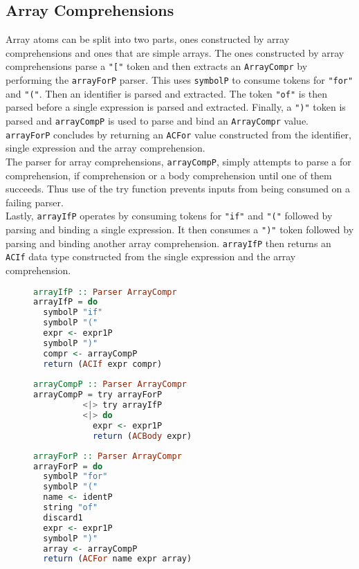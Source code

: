 \documentclass{article}
\begin{document}
\subsection{Array Comprehensions}
Array atoms can be split into two parts, ones constructed by array comprehensions and ones that are simple arrays. The ones constructed by array comprehensions parse a \texttt{"["} token and then extracts an \texttt{ArrayCompr} by performing the \texttt{arrayForP} parser. This uses \texttt{symbolP} to consume tokens for \texttt{"for"} and \texttt{"("}. Then an identifier is parsed and extracted. The token \texttt{"of"} is then parsed before a single expression is parsed and extracted. Finally, a \texttt{")"} token is parsed and \texttt{arrayCompP} is used to parse and bind an \texttt{ArrayCompr} value. \texttt{arrayForP} concludes by returning an \texttt{ACFor} value constructed from the identifier, single expression and the array comprehension.
\bigskip
\\
The parser for array comprehensions, \texttt{arrayCompP}, simply attempts to parse a for comprehension, if comprehension or a body comprehension until one of them succeeds. Thus use of the try function prevents inputs from being consumed on a failing parser.
\bigskip
\\
Lastly, \texttt{arrayIfP} operates by consuming tokens for \texttt{"if"} and \texttt{"("} followed by parsing and binding a single expression. It then consumes a \texttt{")"} token followed by parsing and binding another array comprehension. \texttt{arrayIfP} then returns an \texttt{ACIf} data type constructed from the single expression and the array comprehension.

\begin{figure}[h!]
\begin{minipage}{0.5\textwidth}
\begin{lstlisting}[language=Haskell]
arrayIfP :: Parser ArrayCompr
arrayIfP = do
  symbolP "if"
  symbolP "("
  expr <- expr1P
  symbolP ")"
  compr <- arrayCompP
  return (ACIf expr compr)
  
arrayCompP :: Parser ArrayCompr
arrayCompP = try arrayForP
          <|> try arrayIfP
          <|> do
            expr <- expr1P
            return (ACBody expr)
\end{lstlisting}
\end{minipage}
\begin{minipage}{0.5\textwidth}
\begin{lstlisting}[language=Haskell]
arrayForP :: Parser ArrayCompr
arrayForP = do
  symbolP "for"
  symbolP "("
  name <- identP
  string "of"
  discard1
  expr <- expr1P
  symbolP ")"
  array <- arrayCompP
  return (ACFor name expr array)
\end{lstlisting}
\end{minipage}
\end{figure}
\end{document}
